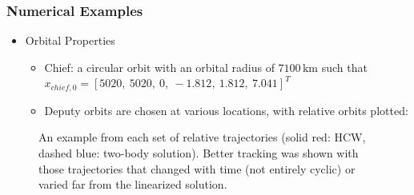 \documentclass[hyperref={pdftex,pdfpagemode=none,pdfstartview=FitH},10pt]{beamer}
\begin{document}
\begin{frame}
\frametitle{Numerical Examples}

\begin{itemize}
\item Orbital Properties
	\begin{itemize}
	\item Chief: a circular orbit with an orbital radius of $7100\,\mathrm{km}$ such that $x_{chief,0}=[5020,\ 5020,\ 0,\ -1.812,\ 1.812,\ 7.041]^T$
	\item Deputy orbits are chosen at various locations, with relative orbits plotted:
	\end{itemize}	
\end{itemize}
\begin{figure}[h]
\centerline{
	\hfill
	\hfill
	\hfill
	\hfill
}
\caption{An example from each set of relative trajectories (solid red: HCW, dashed blue: two-body solution). Better tracking was shown with those trajectories that changed with time (not entirely cyclic) or varied far from the linearized solution.}
\label{fig:0CasesTraj}
\end{figure}


\end{frame}
\end{document}
